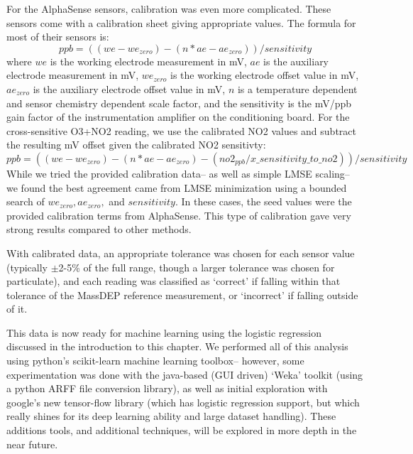For the AlphaSense sensors, calibration was even more complicated.  These sensors come with a calibration sheet giving appropriate values.  The formula for most of their sensors is: \[ppb = ( (we - we_{zero}) - (n*ae - ae_{zero}) ) / sensitivity\] where $we$ is the working electrode measurement in mV, $ae$ is the auxiliary electrode measurement in mV, $we_{zero}$ is the working electrode offset value in mV, $ae_{zero}$ is the auxiliary electrode offset value in mV, $n$ is a temperature dependent and sensor chemistry dependent scale factor, and the sensitivity is the mV/ppb gain factor of the instrumentation amplifier on the conditioning board.  For the cross-sensitive O3+NO2 reading, we use the calibrated NO2 values and subtract the resulting mV offset given the calibrated NO2 sensitivty: \[ppb = ( (we - we_{zero}) - (n*ae - ae_{zero}) - (no2_{ppb} / x\_sensitivity\_to\_no2) ) / sensitivity\]   While we tried the provided calibration data-- as well as simple LMSE scaling-- we found the best agreement came from LMSE minimization using a bounded search of $we_{zero}, ae_{zero},$ and $sensitivity$.  In these cases, the seed values were the provided calibration terms from AlphaSense.  This type of calibration gave very strong results compared to other methods.

With calibrated data, an appropriate tolerance was chosen for each sensor value (typically $\pm$2-5\% of the full range, though a larger tolerance was chosen for particulate), and each reading was classified as `correct' if falling within that tolerance of the MassDEP reference measurement, or `incorrect' if falling outside of it. 

This data is now ready for machine learning using the logistic regression discussed in the introduction to this chapter.  We performed all of this analysis using python's scikit-learn machine learning toolbox-- however, some experimentation was done with the java-based (GUI driven) `Weka' toolkit (using a python ARFF file conversion library), as well as initial exploration with google's new tensor-flow library (which has logistic regression support, but which really shines for its deep learning ability and large dataset handling).  These additions tools, and additional techniques, will be explored in more depth in the near future.


